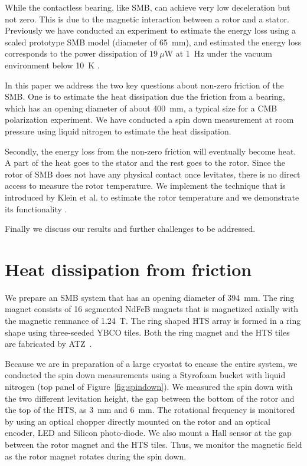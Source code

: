 \documentclass[journal]{IEEEtran}
\begin{document}
While the contactless bearing, like SMB, can achieve very low deceleration but not zero.
This is due to the magnetic interaction between a rotor and a stator.
Previously we have conducted an experiment to estimate the energy loss using a scaled prototype SMB model (diameter of 65~mm), and estimated the energy loss corresponds to the power dissipation of $19~\mu$W at 1~Hz under the vacuum environment below 10~K \cite{matsumura_eucas2015}.

In this paper we address the two key questions about non-zero friction of the SMB.
One is to estimate the heat dissipation due the friction from a bearing, which has an opening diameter of about 400~mm, a typical size for a CMB polarization experiment.
We have conducted a spin down measurement at room pressure using liquid nitrogen to estimate the heat dissipation.

Secondly, the energy loss from the non-zero friction will eventually become heat.
A part of the heat goes to the stator and the rest goes to the rotor.
Since the rotor of SMB does not have any physical contact once levitates, there is no direct access to measure the rotor temperature.
We implement the technique that is introduced by Klein et al. to estimate the rotor temperature and we demonstrate its functionality \cite{jklein}.

Finally we discuss our results and further challenges to be addressed.

\section{Heat dissipation from friction}
We prepare an SMB system that has an opening diameter of 394~mm.
The ring magnet consists of 16 segmented NdFeB magnets that is magnetized axially with the magnetic remnance of 1.24~T.
The ring shaped HTS array is formed in a ring shape using three-seeded YBCO tiles.
Both the ring magnet and the HTS tiles are fabricated by ATZ~\cite{atz}.

Because we are in preparation of a large cryostat to encase the entire system, we conducted the spin down measurements using a Styrofoam bucket with liquid nitrogen (top panel of Figure~\ref{fig:spindown}).
We measured the spin down with the two different levitation height, the gap between the bottom of the rotor and the top of the HTS, as 3~mm and 6~mm.
The rotational frequency is monitored by using an optical chopper directly mounted on the rotor and an optical encoder, LED and Silicon photo-diode.
We also mount a Hall sensor at the gap between the rotor magnet and the HTS tiles.
Thus, we monitor the magnetic field as the rotor magnet rotates during the spin down.
\end{document}
